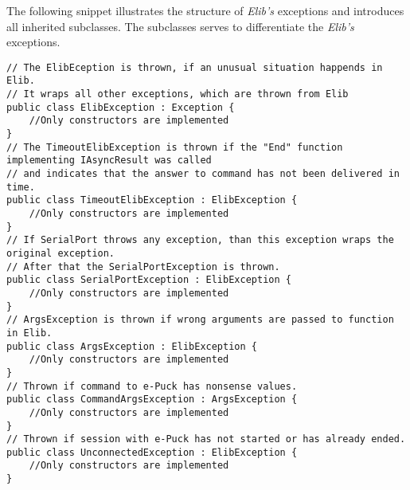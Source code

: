 	The following snippet illustrates the structure of {\it Elib's} exceptions and
	introduces all inherited subclasses.
	The subclasses serves to differentiate the {\it Elib's} exceptions.
\begin{lstlisting}
// The ElibEception is thrown, if an unusual situation happends in Elib.
// It wraps all other exceptions, which are thrown from Elib
public class ElibException : Exception { 
	//Only constructors are implemented
}
// The TimeoutElibException is thrown if the "End" function implementing IAsyncResult was called 
// and indicates that the answer to command has not been delivered in time.
public class TimeoutElibException : ElibException { 
	//Only constructors are implemented
}
// If SerialPort throws any exception, than this exception wraps the original exception.
// After that the SerialPortException is thrown.
public class SerialPortException : ElibException {
	//Only constructors are implemented
}
// ArgsException is thrown if wrong arguments are passed to function in Elib.
public class ArgsException : ElibException {
	//Only constructors are implemented
}
// Thrown if command to e-Puck has nonsense values.
public class CommandArgsException : ArgsException {
	//Only constructors are implemented
}
// Thrown if session with e-Puck has not started or has already ended.
public class UnconnectedException : ElibException {
	//Only constructors are implemented
}

\end{lstlisting}
